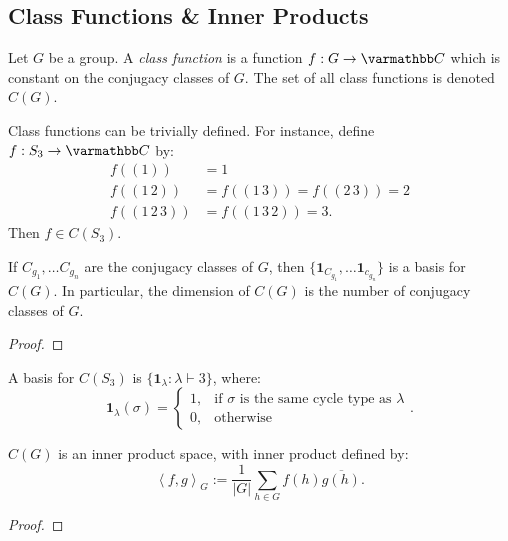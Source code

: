 \subsection{Class Functions \& Inner Products}

\begin{definition}
	Let $G$ be a group. A \emph{class function} is a function $f:G \rightarrow \bfC$ which is constant on the conjugacy classes of $G$. The set of all class functions is denoted $C(G)$.
\end{definition}

\begin{example}
	Class functions can be trivially defined. For instance, define $f:S_3 \rightarrow \bfC$ by:
	\begin{align*}
		f((1)) &=1 \\
		f((1\,2)) &= f((1\,3)) = f((2\,3)) = 2 \\
		f((1\,2\,3)) &= f((1\,3\,2)) = 3.
	\end{align*}
	Then $f \in C(S_3)$.
\end{example}

\begin{proposition}
	If $C_{g_1},\ldots C_{g_n}$ are the conjugacy classes of $G$, then $\{\mathbf{1}_{C_{g_1}}, \ldots \mathbf{1}_{c_{g_n}}\}$ is a basis for $C(G)$. In particular, the dimension of $C(G)$ is the number of conjugacy classes of $G$.
\end{proposition}
	{\color{red}
	\begin{proof}
			
	\end{proof}}

\begin{example}
	A basis for $C(S_3)$ is $\{\mathbf{1}_\lambda : \lambda \vdash 3\}$, where:
	\[
		\mathbf{1}_{\lambda}(\sigma) = \begin{cases} 1, & \text{if $\sigma$ is the same cycle type as $\lambda$} \\ 0, & \text{otherwise}\end{cases}.
	\] 
\end{example}

\begin{theorem}
	$C(G)$ is an inner product space, with inner product defined by:
	\[
		\left<f,g \right>_G := \frac{1}{|G|}\sum_{h \in G}^{} f(h)\overline{g(h)}.
	\] 
\end{theorem}
	{\color{red}
	\begin{proof}
			
	\end{proof}}

